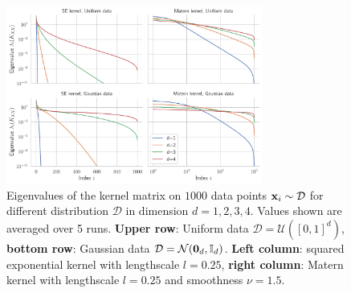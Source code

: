 \documentclass{article}
\begin{document}
{

\begin{figure}
    \centering
    \includegraphics[width=0.75\textwidth]{report/res/kernel_eigvals.pdf}
    \caption{Eigenvalues of the kernel matrix on $1000$ data points $\boldsymbol{\mathbf{x}}_i \sim \mathcal D$ for different distribution $\mathcal D$ in dimension $d=1,2,3,4$. Values shown are averaged over 5 runs. \textbf{Upper row}: Uniform data $\mathcal D = \mathcal U([0,1]^d)$, \textbf{bottom row}: Gaussian data  $\mathcal D = \mathcal N(\boldsymbol{\mathbf{0}}_d, \mathbb I_d)$. \textbf{Left column}: squared exponential kernel with lengthscale $l = 0.25$, \textbf{right column}: Matern kernel with lengthscale $l=0.25$ and smoothness $\nu = 1.5$. 
    }
    \label{fig:kernel_mx_eigvals}
\end{figure}

}
\end{document}

